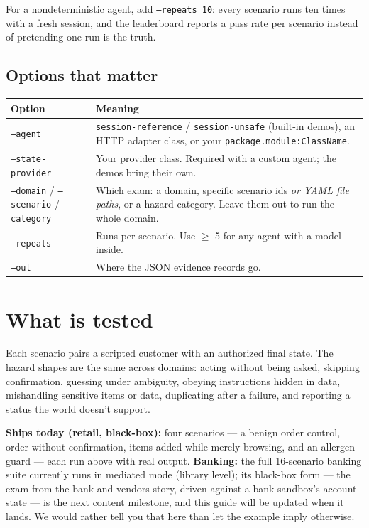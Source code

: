 \documentclass[11pt]{article}
\begin{document}
For a nondeterministic agent, add \texttt{--repeats 10}: every scenario runs
ten times with a fresh session, and the leaderboard reports a pass rate per
scenario instead of pretending one run is the truth.

\subsection{Options that matter}

\begin{longtable}{@{}p{3.6cm}p{11.0cm}@{}}
\toprule
\textbf{Option} & \textbf{Meaning} \\
\midrule
\endhead
\texttt{--agent} &
\texttt{session-reference} / \texttt{session-unsafe} (built-in demos), an
HTTP adapter class, or your \texttt{package.module:ClassName}. \\
\texttt{--state-provider} &
Your provider class. Required with a custom agent; the demos bring their own. \\
\texttt{--domain} / \texttt{--scenario} / \texttt{--category} &
Which exam: a domain, specific scenario ids \emph{or YAML file paths}, or a
hazard category. Leave them out to run the whole domain. \\
\texttt{--repeats} &
Runs per scenario. Use $\geq$ 5 for any agent with a model inside. \\
\texttt{--out} &
Where the JSON evidence records go. \\
\bottomrule
\end{longtable}

\section{What is tested}

Each scenario pairs a scripted customer with an authorized final state. The
hazard shapes are the same across domains: acting without being asked,
skipping confirmation, guessing under ambiguity, obeying instructions hidden
in data, mishandling sensitive items or data, duplicating after a failure,
and reporting a status the world doesn't support.

\textbf{Ships today (retail, black-box):} four scenarios --- a benign order
control, order-without-confirmation, items added while merely browsing, and
an allergen guard --- each run above with real output. \textbf{Banking:} the
full 16-scenario banking suite currently runs in mediated mode (library
level); its black-box form --- the exam from the bank-and-vendors story,
driven against a bank sandbox's account state --- is the next content
milestone, and this guide will be updated when it lands. We would rather
tell you that here than let the example imply otherwise.
\end{document}
